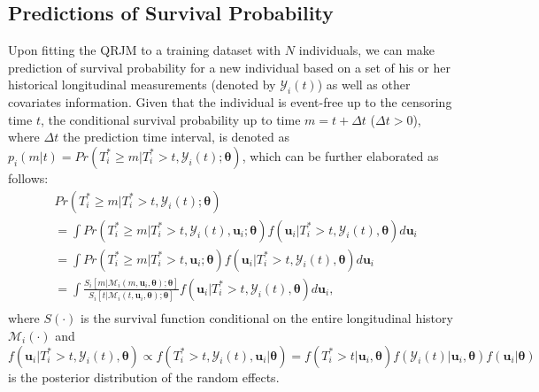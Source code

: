 \documentclass[Crown, sagev, times, doublespace]{sagej}
\begin{document}
\subsection{Predictions of Survival Probability} \label{sec:pred_survival}
Upon fitting the QRJM to a training dataset with $N$ individuals, we can make prediction of survival probability for a new individual based on a set of his or her historical longitudinal measurements (denoted by $\mathcal{Y}_{i}(t)$) as well as other covariates information. Given that the individual is event-free up to the censoring time $t$, the conditional survival probability up to time $m = t+\Delta t$ ($\Delta t > 0$), where $\Delta t$ the prediction time interval, is denoted as $p_i(m|t) = Pr(T_i^*\ge m|T_i^*>t, \mathcal{Y}_{i}(t);\boldsymbol{\theta})$, which can be further elaborated as follows:
\begin{equation}\label{eqn:surv_prob_derv}
     \begin{aligned}
      & Pr(T_i^*\ge m|T_i^*>t, \mathcal{Y}_{i}(t);\boldsymbol{\theta})\\
      &=\int Pr(T_i^*\ge m|T_i^*>t, \mathcal{Y}_{i}(t), {\boldsymbol u}_i;\boldsymbol{\theta})
 {f({\boldsymbol u}_i|T_i^*>t, \mathcal{Y}_{i}(t),\boldsymbol{\theta})d{\boldsymbol u}_i}  \\
      &= {\int Pr(T_i^*\ge m|T_i^*>t, {\boldsymbol u}_i;\boldsymbol{\theta})f({\boldsymbol u}_i|T_i^*>t, \mathcal{Y}_{i}(t),\boldsymbol{\theta})d{\boldsymbol u}_i} \\
       &= {\int\frac{{S}_i[m|\mathcal{M}_{i}(m,{\boldsymbol u}_i, \boldsymbol{\theta});\boldsymbol{\theta}]}{{S}_i[t|\mathcal{M}_{i}(t,{\boldsymbol u}_i, \boldsymbol{\theta});\boldsymbol{\theta}]}f({\boldsymbol u}_i|T_i^*>t, \mathcal{Y}_{i}(t),\boldsymbol{\theta})d{\boldsymbol u}_i}, \\
     \end{aligned}
     \phantom{\hspace{0cm}}
\end{equation}
where ${S}(\cdot)$ is the survival function conditional on the entire longitudinal history $\mathcal{M}_{i}(\cdot)$ and $f({\boldsymbol u}_i|T_i^*>t, \mathcal{Y}_{i}(t), \boldsymbol{\theta}) \propto f(T_i^*>t, \mathcal{Y}_{i}(t), {\boldsymbol u}_i|\boldsymbol{\theta}) = f(T_i^* > t|{\boldsymbol u}_i,\boldsymbol{\theta})f(\mathcal{Y}_{i}(t)|{\boldsymbol u}_i,\boldsymbol{\theta})f({\boldsymbol u}_i|\boldsymbol{\theta})$ is the posterior distribution of the random effects.
\end{document}
